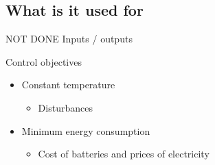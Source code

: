 \subsection{What is it used for}


	
NOT DONE
Inputs / outputs

Control objectives
\begin{itemize}
	\item Constant temperature
		\begin{itemize}
			\item Disturbances
		\end{itemize}
	\item Minimum energy consumption
		\begin{itemize}
			\item Cost of batteries and prices of electricity
		\end{itemize}
\end{itemize}

		
